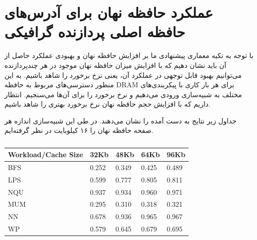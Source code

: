 \documentclass{thesis}
\begin{document}
\section{
عملکرد حافظه نهان برای آدرس‌های حافظه اصلی پردازنده گرافیکی
}

با توجه به تکیه معماری پیشنهادی ما بر افزایش حافظه نهان و بهبودی عملکرد حاصل از
آن باید نشان دهیم که با افزایش میزان حافظه نهان موجود در هر چندپردازنده
می‌توانیم بهبود قابل توجهی در عملکرد آن، یعنی نرخ برخورد را شاهد باشیم. به این
منظور دسترسی‌های  مربوط به حافظه
DRAM
برای هر بار کاری با پیکربندی‌های مختلف به شبیه‌سازی ورودی می‌دهیم و نرخ برخورد
را برای آن‌ها می‌سنجیم. انتظار داریم که با افزایش حجم حافظه نهان نرخ برخورد
بهتری را شاهد باشیم. 

جداول زیر نتایج به دست آمده را نشان می‌دهند.
در طی این شبیه‌سازی اندازه هر صفحه
حافظه نهان را ۱۶ کیلوبایت در نظر گرفته‌ایم.

\begin{center}
\begin{table}[h!]
\begin{latin}
\begin{tabular}{|p{}|p{}|p{}|p{}|p{}|}
\hline
Workload/Cache Size & 32Kb  & 48Kb  & 64Kb  & 96Kb \\
\hline
BFS                 & 0.252 & 0.349 & 0.425 & 0.489 \\
\hline
LPS                 & 0.599 & 0.777 & 0.805 & 0.811 \\
\hline
NQU                 & 0.937 & 0.934 & 0.960 & 0.971 \\
\hline
MUM                 & 0.295 & 0.310 & 0.318 & 0.321 \\
\hline
NN                  & 0.678 & 0.936 & 0.965 & 0.967 \\
\hline
WP                  & 0.579 & 0.645 & 0.679 & 0.695 \\
\hline
\end{tabular}
\end{latin}
\caption{%
}
\label{table:ispasshitrate}
\end{table}
\end{center}
\end{document}
